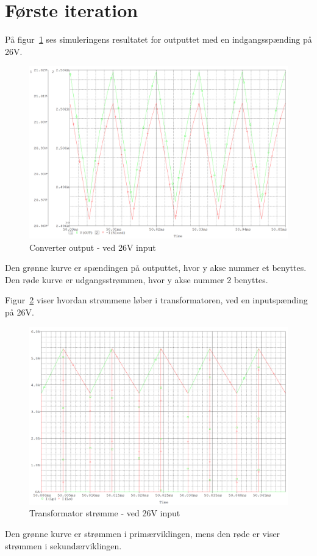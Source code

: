 \section{Første iteration}
På figur~\ref{fig:26V_ideal_output} ses simuleringens resultatet for outputtet med en indgangsspænding på 26V.
\begin{figure}[H]
	\center
	\includegraphics[max width=0.8\linewidth]{../dokumentation/tex/1iteration/billeder/26V_output.PNG}
	\caption{Converter output - ved 26V input}
	\label{fig:26V_ideal_output}
\end{figure}
\noindent Den grønne kurve er spændingen på outputtet, hvor y akse nummer et benyttes. Den røde kurve er udgangsstrømmen, hvor y akse nummer 2 benyttes.
 
Figur~\ref{fig:26V_transformer_current} viser hvordan strømmene løber i transformatoren, ved en inputspænding på 26V.
\begin{figure}[H]
	\center
	\includegraphics[max width=0.7\linewidth]{../dokumentation/tex/1iteration/billeder/26V_transformer_current.PNG}
	\caption{Transformator strømme - ved 26V input}
	\label{fig:26V_transformer_current}
\end{figure}
\noindent Den grønne kurve er strømmen i primærviklingen, mens den røde er viser strømmen i sekundærviklingen.

